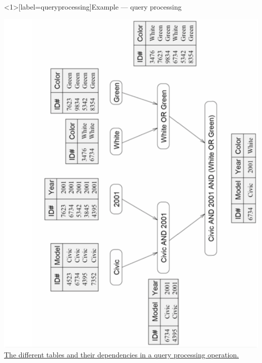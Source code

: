 \documentclass[10pt, t]{beamer}
\begin{document}
  \begin{frame}<1>[label=queryprocessing]{Example --- query processing}
    \vspace{-3ex}
    \begin{center}
      \includegraphics[angle=-90,width=.80\textwidth]{query1}\\
      \hfill\tiny{\href{https://www.pearson.com/us/higher-education/program/Grama-Introduction-to-Parallel-Computing-2nd-Edition/PGM11645.html}{The different tables and their dependencies in a query processing operation.}}
    \end{center}

  \end{frame}
\end{document}
